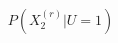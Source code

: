 \documentclass[preview]{standalone}
\begin{document}
\begin{align*}
P(X^{(r)}_2 | U=1)
\end{align*}
\end{document}

